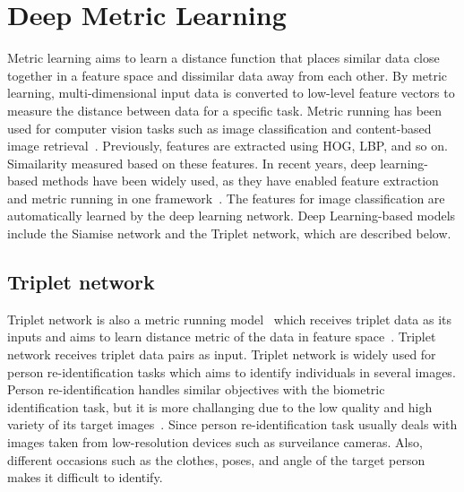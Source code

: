 \label{chp:Preliminary}
\section{Deep Metric Learning}
Metric learning aims to learn a distance function that places similar data close together in a feature space and dissimilar data away from each other.
By metric learning, multi-dimensional input data is converted to low-level feature vectors to measure the distance between data for a specific task.
Metric running has been used for computer vision tasks such as image classification and content-based image retrieval~\cite{yang2006distance}. Previously, features are extracted using HOG, LBP, and so on. Simailarity measured based on these features.
In recent years, deep learning-based methods have been widely used, as they have enabled feature extraction and metric running in one framework~\cite{yi2014deep}.
The features for image classification are automatically learned by the deep learning network.
Deep Learning-based models include the Siamise network and the Triplet network, which are described below.

\subsection{Triplet network}
Triplet network is also a metric running model~\cite{weinberger2006distance} which receives triplet data as its inputs and aims to learn distance metric of the data in feature space~\cite{yang2006distance}.
Triplet network receives triplet data pairs as input.
Triplet network is widely used for person re-identification tasks which aims to identify individuals in several images. 
Person re-identification handles similar objectives with the biometric identification task, but it is more challanging due to the low quality and high variety of its target images~\cite{yi2014deep}. Since person re-identification task usually deals with images taken from low-resolution devices such as surveilance cameras. Also, different occasions such as the clothes, poses, and angle of the target person makes it difficult to identify.

